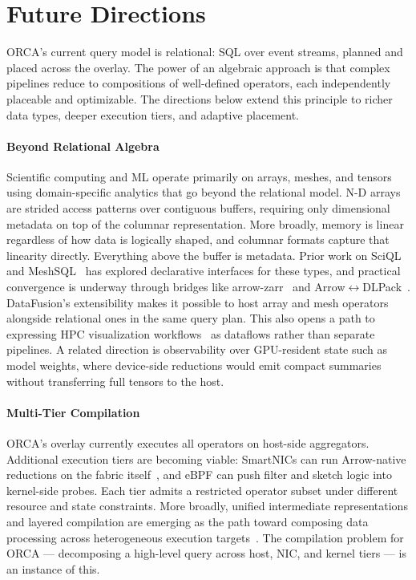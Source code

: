 \section{Future Directions}\label{sec:concl:future}

ORCA's current query model is relational: SQL over event streams, planned and placed across the
overlay.
The power of an algebraic approach is that complex pipelines reduce to compositions of well-defined
operators, each independently placeable and optimizable.
The directions below extend this principle to richer data types, deeper execution tiers, and
adaptive placement.

\paragraph{Beyond Relational Algebra}
Scientific computing and ML operate primarily on arrays,
meshes, and tensors using domain-specific analytics that go beyond the relational model.
N-D arrays are strided access patterns over contiguous buffers, requiring only dimensional metadata
on top of the columnar representation.
More broadly, memory is linear regardless of how data is logically shaped, and columnar formats
capture that linearity directly.
Everything above the buffer is metadata.
Prior work on SciQL~\cite{Kerst2011:SciQL} and MeshSQL~\cite{Lee2004:MeshSQL} has explored
declarative interfaces for these types, and practical
convergence is underway through bridges like arrow-zarr~\cite{2026:arrow-zarr} and
Arrow$\leftrightarrow$DLPack~\cite{:DLPackProtocolApache}.
DataFusion's extensibility makes it possible to host array and mesh operators
alongside relational ones in the same query plan.
This also opens a path to expressing HPC visualization
workflows~\cite{Ayach2015:Catalyst,Larse2022:Ascent} as dataflows rather than separate
pipelines.
A related direction is observability over GPU-resident state such as model weights, where
device-side reductions would
emit compact summaries without transferring full tensors to the host.

\paragraph{Multi-Tier Compilation}
ORCA's overlay currently executes all operators on host-side aggregators.
Additional execution tiers are becoming viable: SmartNICs can run Arrow-native reductions on the
fabric itself~\cite{Ulmer2023:ExtendingComposableDatab,Liu2022:ProcessingParticleData}, and eBPF
can push filter and sketch logic into kernel-side probes.
Each tier admits a restricted operator subset under different resource and state constraints.
More broadly, unified intermediate representations and layered compilation are emerging as the path
toward composing data processing across heterogeneous execution
targets~\cite{Jungm2025:DesigningFutureProofData}.
The compilation problem for ORCA --- decomposing a high-level query across
host, NIC, and kernel tiers --- is an instance of this.

